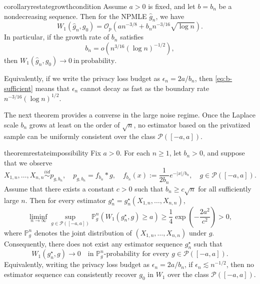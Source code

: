 \documentclass[english, 11pt]{article}
\theoremstyle{plain}
\theoremstyle{definition}
\theoremstyle{remark}
\begin{document}
\begin{restatable}{corollary}{restategrowthcondition}\label{cor:b-growth}
Assume $a>0$ is fixed, and let $b=b_n$ be a nondecreasing sequence.
Then for the NPMLE $\widehat g_n$, we have
\begin{equation}\label{eq:w1-rate-bn}
W_1(\widehat g_n,g_0) = \mathcal O_p \left( a n^{-3/8} + b_n n^{-3/16}\sqrt{\log n} \right).
\end{equation}
In particular, if the growth rate of $b_n$ satisfies
\begin{equation}\label{eq:b-sufficient}
b_n=o\left(n^{3/16}(\log n)^{-1/2}\right),
\end{equation}
then
$W_1(\widehat g_n,g_0)\to 0\ \mathrm{ in\ probability}$.

Equivalently, if we write the privacy loss budget as $\epsilon_n={2a}/{b_n}$, then \eqref{eq:b-sufficient} means that $\epsilon_n$ cannot decay as fast as the boundary rate $n^{-3/16}(\log n)^{1/2}$.
\end{restatable}

The next theorem provides a converse in the large noise regime. Once the Laplace scale $b_n$ grows at least on the order of $\sqrt n$, no estimator based on the privatized sample can be uniformly consistent over the class $\mathcal P([-a,a])$.

\begin{restatable}{theorem}{restateimpossibility}\label{thm:impossibility-sqrtn}
Fix $a>0$. For each $n\ge1$, let $b_n>0$, and suppose that we observe
\begin{equation*}
X_{1,n},\dots,X_{n,n}\overset{iid}{\sim} p_{g,b_n}, \quad p_{g,b_n}=f_{b_n}*g, \quad f_{b_n}(x):=\frac1{2b_n}e^{-|x|/b_n}, \quad g\in\mathcal P([-a,a]).
\end{equation*}
Assume that there exists a constant $c>0$ such that
$b_n\ge c\sqrt n$
for all sufficiently large $n$. Then for every estimator $g_n^\star=g_n^\star(X_{1,n},\dots,X_{n,n})$,
\begin{equation}\label{eq:minimax-impossibility}
\liminf_{n\to\infty}\sup_{g\in\mathcal P([-a,a])}
\mathbb P_{g}^{n} \left( W_1(g_n^\star,g)\ge a \right) \ge \frac14\exp \left(-\frac{2a^2}{c^2}\right) >0,
\end{equation}
where $\mathbb P_{g}^{n}$ denotes the joint distribution of $(X_{1,n},\dots,X_{n,n})$ under $g$.
Consequently, there does not exist any estimator sequence $g_n^\star$ such that
\begin{equation*}
W_1(g_n^\star,g)\to 0
\quad\text{in }\mathbb P_{g}^{n}\text{-probability for every }g\in\mathcal P([-a,a]).
\end{equation*}
Equivalently, writing the privacy loss budget as $\epsilon_n={2a}/{b_n}$, if $\epsilon_n\lesssim n^{-1/2}$, then no estimator sequence can consistently recover $g_0$ in $W_1$ over the class $\mathcal P([-a,a])$.
\end{restatable}
\end{document}
